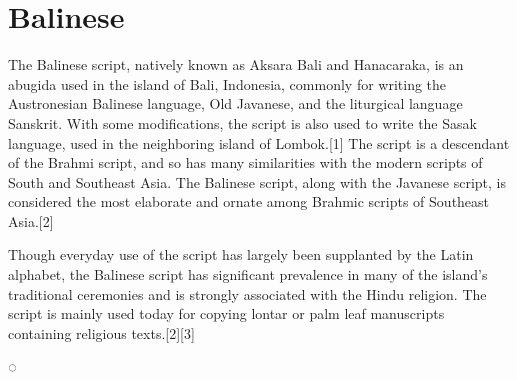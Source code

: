 \section{Balinese}

The Balinese script, natively known as Aksara Bali and Hanacaraka, is an abugida used in the island of Bali, Indonesia, commonly for writing the Austronesian Balinese language, Old Javanese, and the liturgical language Sanskrit. With some modifications, the script is also used to write the Sasak language, used in the neighboring island of Lombok.[1] The script is a descendant of the Brahmi script, and so has many similarities with the modern scripts of South and Southeast Asia. The Balinese script, along with the Javanese script, is considered the most elaborate and ornate among Brahmic scripts of Southeast Asia.[2]

Though everyday use of the script has largely been supplanted by the Latin alphabet, the Balinese script has significant prevalence in many of the island's traditional ceremonies and is strongly associated with the Hindu religion. The script is mainly used today for copying lontar or palm leaf manuscripts containing religious texts.[2][3]



{\indicative ◌ }

\setcounter{under}{"1B00}

